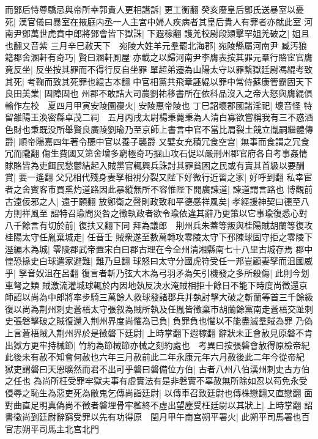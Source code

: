 而鄧后恃尊驕忌與帝所幸郭貴人更相譖訴|{
	更工衡翻}
癸亥廢皇后鄧氏送暴室以憂死|{
	漢官儀曰暴室在掖庭内丞一人主宮中婦人疾病者其皇后貴人有罪者亦就此室}
河南尹鄧萬世虎賁中郎將鄧會皆下獄誅|{
	下遐稼翻}
護羌校尉段熲擊罕姐羌破之|{
	姐且也翻又音紫}
三月辛巳赦天下　宛陵大姓羊元羣罷北海郡|{
	宛陵縣屬河南尹}
臧汚狼籍郡舍溷軒有奇巧|{
	賢曰溷軒厠屋}
亦載之以歸河南尹李膺表按其罪元羣行賂宦官膺竟反坐|{
	反坐按其罪而不得行反自坐罪}
單超弟遷為山陽太守以罪繫獄廷尉馮緄考致其死|{
	考鞠而致其死罪也緄古本翻}
中官相黨共飛章誣緄以罪中常侍蘇康管霸固天下良田美業|{
	固障固也}
州郡不敢詰大司農劉祐移書所在依科品沒入之帝大怒與膺緄俱輸作左校　夏四月甲寅安陵園寑火|{
	安陵惠帝陵也}
丁巳詔壞郡國諸淫祀|{
	壞音怪}
特留雒陽王渙密縣卓茂二祠　五月丙戌太尉楊秉薨秉為人清白寡欲嘗稱我有三不惑酒色財也秉既没所舉賢良廣陵劉瑜乃至京師上書言中官不當比肩裂土競立胤嗣繼體傳爵|{
	順帝陽嘉四年著令聽中官以養子襲爵}
又嬖女充積冗食空宫|{
	無事而食謂之冗食冗而隴翻}
傷生費國又第舍增多窮極奇巧掘山攻石促以嚴刑州郡官府各自考事姦情賕賂皆為吏餌民愁鬱結起入賊黨官輒興兵誅討其罪貧困之民或有賣其首級以要酬賞|{
	要一遙翻}
父兄相代殘身妻孥相視分裂又陛下好微行近習之家|{
	好呼到翻}
私幸宦者之舍賓客市買熏灼道路因此暴縱無所不容惟陛下開廣諫道|{
	諫道謂言路也}
博觀前古遠佞邪之人|{
	遠于願翻}
放鄭衛之聲則政致和平德感祥風矣|{
	孝經援神契曰德至八方則祥風至}
詔特召瑜問災咎之徵執政者欲令瑜依違其辭乃更策以它事瑜復悉心對八千餘言有切於前|{
	復扶又翻下同}
拜為議郎　荆州兵朱蓋等叛與桂陽賊胡蘭等復攻桂陽太守任胤棄城走|{
	任音壬}
賊衆遂至數萬轉攻零陵太守下邳陳球固守拒之零陵下溼編木為城|{
	零陵郡武帝置宋白曰郡古理在今全州清湘縣南七十八里古城存焉}
郡中惶恐掾史白球遣家避難|{
	難乃旦翻}
球怒曰太守分國虎符受任一邦豈顧妻孥而沮國威乎|{
	孥音奴沮在呂翻}
復言者斬乃弦大木為弓羽矛為矢引機發之多所殺傷|{
	此則今划車弩之類}
賊激流灌城球輒於内因地埶反决水淹賊相拒十餘日不能下時度尚徵還京師詔以尚為中郎將率步騎三萬餘人救球發諸郡兵并埶討擊大破之斬蘭等首三千餘級復以尚為荆州刺史蒼梧太守張叙為賊所執及任胤皆徵棄市胡蘭餘黨南走蒼梧交趾刺史張磐擊破之賊復還入荆州界度尚懼為已負|{
	負罪負也懼以不能盡滅羣賊為罪}
乃偽上言蒼梧賊入荆州界於是徵磐下廷尉|{
	上時掌翻下遐稼翻}
辭狀未正會赦見原磐不肯出獄方更牢持械節|{
	竹約為節械節亦械之刻約處也　考異曰按張磐會赦得原檢帝紀此後未有赦不知會何赦也六年三月赦前此二年永康元年六月赦後此二年今從帝紀}
獄吏謂磐曰天恩曠然而君不出可乎磐曰磐備位方伯|{
	古者八州八伯漢州刺史古方伯之任也}
為尚所枉受罪牢獄夫事有虛實法有是非磐實不辜赦無所除如忍以苟免永受侵辱之恥生為惡吏死為敝鬼乞傳尚詣廷尉|{
	以傳車召致廷尉也傳株戀翻又直戀翻}
面對曲直足明真偽尚不徵者磐埋骨牢檻終不虛出望塵受枉廷尉以其狀上|{
	上時掌翻}
詔書徵尚到廷尉辭窮受罪以先有功得原　閏月甲午南宫朔平署火|{
	此朔平司馬署也百官志朔平司馬主北宫北門}
